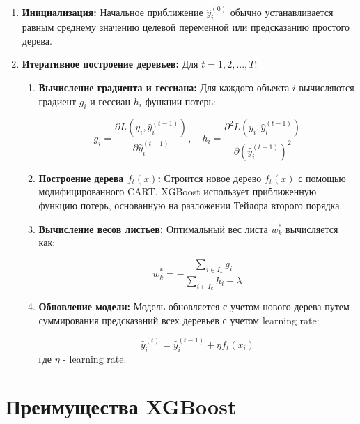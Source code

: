 \begin{enumerate}
    \item \textbf{Инициализация:} Начальное приближение $\hat{y}_i^{(0)}$ обычно устанавливается равным среднему значению целевой переменной или предсказанию простого дерева.

    \item \textbf{Итеративное построение деревьев:} Для $t = 1, 2, ..., T$:
          \begin{enumerate}
              \item \textbf{Вычисление градиента и гессиана:}  Для каждого объекта $i$ вычисляются градиент $g_i$ и гессиан $h_i$ функции потерь:

                    \[
                        g_i = \frac{\partial L(y_i, \hat{y}_i^{(t-1)})}{\partial \hat{y}_i^{(t-1)}}, \quad h_i = \frac{\partial^2 L(y_i, \hat{y}_i^{(t-1)})}{\partial (\hat{y}_i^{(t-1)})^2}
                    \]

              \item \textbf{Построение дерева $f_t(x)$:}  Строится новое дерево $f_t(x)$ с помощью модифицированного CART.  XGBoost использует приближенную функцию потерь, основанную на разложении Тейлора второго порядка.


              \item \textbf{Вычисление весов листьев:}  Оптимальный вес листа $w_k^*$ вычисляется как:

                    \[
                        w_k^* = - \frac{\sum_{i \in I_k} g_i}{\sum_{i \in I_k} h_i + \lambda}
                    \]

              \item \textbf{Обновление модели:} Модель обновляется с учетом нового дерева путем суммирования предсказаний всех деревьев с учетом learning rate:

                    \[
                        \hat{y}_i^{(t)} = \hat{y}_i^{(t-1)} + \eta f_t(x_i)
                    \]
                    где $\eta$ - learning rate.

          \end{enumerate}
\end{enumerate}

\section*{Преимущества XGBoost}

